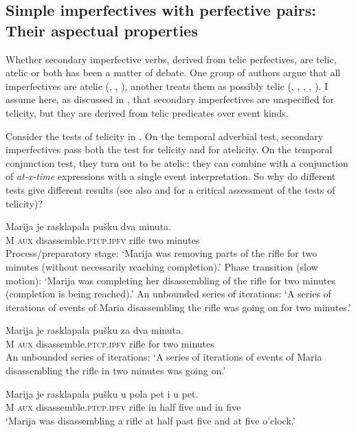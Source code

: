 \documentclass[output=paper]{langscibook}
\begin{document}
\subsection{Simple imperfectives with perfective pairs: Their aspectual properties}\label{ars:sec:impftel}

Whether secondary imperfective verbs, derived from telic perfectives, are telic, atelic or both has been a matter of debate. One group of authors argue that all imperfectives are atelic (\cite{Borer.2005}, \cite{Macdon.2008}, \cite{Lazor.2010}), another treats them as possibly telic (\cite{Arsenij.2006}, \cite{Borik.2006}, \cite{Brag.2008}, \cite{Stanoj.2012}, \cite{Fleisch.2019}). I assume here, as discussed in , that secondary imperfectives are unspecified for telicity, but they are derived from telic predicates over event kinds. 

Consider the tests of telicity in . On the temporal adverbial test, secondary imperfectives pass both the test for telicity and for atelicity. On the temporal conjunction test, they turn out to be atelic: they can combine with a conjunction of \textit{at-x-time} expressions with a single event interpretation. So why do different tests give different results (see also \cite{Mittwoch.2010, Mittwoch.2013} and  for a critical assessment of the tests of telicity)?

\ea\label{ars:ex:test-SI}
	\begin{xlist} 
		
	    \ex  \gll Marija je rasklapala pušku dva minuta.\\ 
                  M \textsc{aux} disassemble\textsc{.ptcp.ipfv} rifle two minutes\\ 
            \ea Process\slash preparatory stage: `Marija was removing parts of the rifle for two minutes (without necessarily reaching completion).'
            \ex Phase transition (slow motion): `Marija was completing her disassembling of the rifle for two minutes (completion is being reached).'
            \ex An unbounded series of iterations: `A series of iterations of events of Maria disassembling the rifle was going on for two minutes.'  
            \z\label{ars:ex:test-SIa}
            
           \ex  \gll Marija je rasklapala pušku za dva minuta.\\ 
            M \textsc{aux} disassemble\textsc{.ptcp.ipfv} rifle for two minutes\\ 
            \glt An unbounded series of iterations: `A series of iterations of events of Maria disassembling the rifle in two minutes was going on.'
            \label{ars:ex:test-SIb}
            
        \ex  \gll Marija je rasklapala pušku u pola pet i u pet.\\ 
                 M \textsc{aux} disassemble\textsc{.ptcp.ipfv} rifle in half five and in five\\ 
            \glt `Marija was disassembling a rifle at half past five and at five o'clock.' \label{ars:ex:test-SIc}

	\end{xlist}
\z
\end{document}

